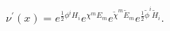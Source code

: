 \begin{equation}
\nu ^{\prime }(x)=e^{\frac{1}{2}\phi ^{i}H_{i}}e^{\chi
^{m}E_{m}}e^{\widetilde{\chi }^{m}\widetilde{E}_{m}}e^{
\frac{1}{2}\widetilde{\phi }^{i}\widetilde{H}_{i}}.
\end{equation}

